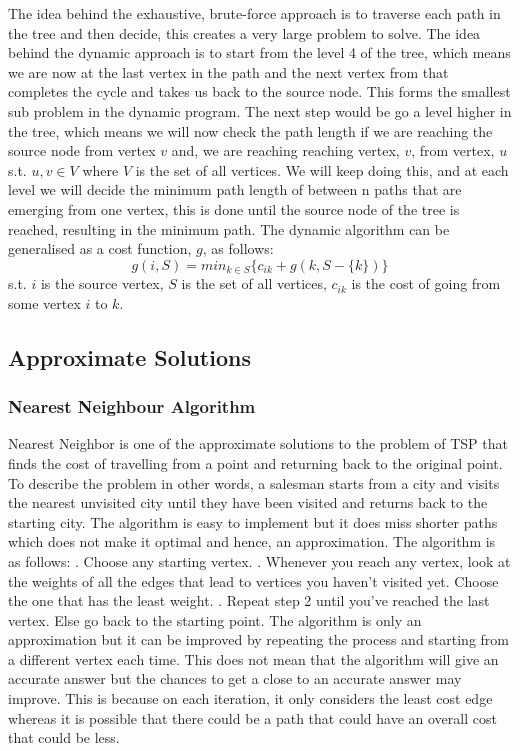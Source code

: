 \documentclass[11pt]{article}
\begin{document}
The idea behind the exhaustive, brute-force approach is to traverse each path in the tree and then decide, this creates a very large problem to solve. The idea behind the dynamic approach is to start from the level 4 of the tree, which means we are now at the last vertex in the path and the next vertex from that completes the cycle and takes us back to the source node. This forms the smallest sub problem in the dynamic program. The next step would be go a level higher in the tree, which means we will now check the path length if we are reaching the source node from vertex $v$ and, we are reaching reaching vertex, $v$, from vertex, $u$ s.t. $u,v \in V$ where $V$ is the set of all vertices. We will keep doing this, and at each level we will decide the minimum path length of between n paths that are emerging from one vertex, this is done until the source node of the tree is reached, resulting in the minimum path. The dynamic algorithm can be generalised as a cost function, $g$, as follows:
$$g(i, S) = min_{k\in S} \bigg\{c_{ik} + g(k, S-\{k\})\bigg\}$$
s.t. $i$ is the source vertex, $S$ is the set of all vertices, $c_{ik}$ is the cost of going from some vertex $i$ to $k$. 
	

		
		
		
\subsection{ Approximate Solutions}
\subsubsection {Nearest Neighbour Algorithm}
		Nearest Neighbor is one of the approximate solutions to the problem of TSP that finds the cost of travelling from a point and returning back to the original point. To describe the problem in other words, a salesman starts from a city and visits the nearest unvisited city until they have been visited and returns back to the starting city. The algorithm is easy to implement but it does miss shorter paths which does not make it optimal and hence, an approximation.\newpage
		The algorithm is as follows: .  Choose any starting vertex. .  Whenever you reach any vertex, look at the weights of all the edges that lead to vertices you haven’t visited yet. Choose the one that has the least weight. .  Repeat step 2 until you’ve reached the last vertex. Else go back to the starting point. \newline \newline
        The algorithm is only an approximation but it can be improved by repeating the process and starting from a different vertex each time. This does not mean that the algorithm will give an accurate answer but the chances to get a close to an accurate answer may improve. This is because on each iteration, it only considers the least cost edge whereas it is possible that there could be a path that could have an overall cost that could be less.   
\end{document}

